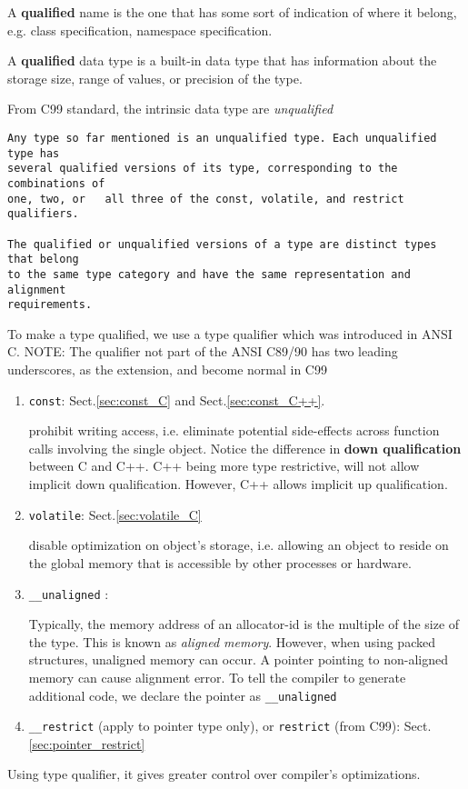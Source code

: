 A {\bf qualified} name is the one that has some sort of indication of where it
belong, e.g. class specification, namespace specification. 


 A {\bf qualified} data type is a built-in data type that has information
about the storage size, range of values, or precision of the type.  


From C99 standard,
the intrinsic data type are {\it unqualified}
\begin{verbatim}
Any type so far mentioned is an unqualified type. Each unqualified type has
several qualified versions of its type, corresponding to the combinations of
one, two, or   all three of the const, volatile, and restrict qualifiers.

The qualified or unqualified versions of a type are distinct types that belong
to the same type category and have the same representation and alignment
requirements.   
\end{verbatim}

To make a type qualified, we use a type qualifier which was introduced in ANSI
C. NOTE: The qualifier not part of the ANSI C89/90 has two leading underscores,
as the extension, and become normal in C99
\begin{enumerate}
  \item \verb!const!: Sect.\ref{sec:const_C} and Sect.\ref{sec:const_C++}.
  
prohibit writing access, i.e. eliminate potential side-effects across function
calls involving the single object. Notice the difference in {\bf down
qualification} between C and C++. C++ being more type restrictive, will not
allow implicit down qualification. However, C++ allows implicit up
qualification.

  \item \verb!volatile!: Sect.\ref{sec:volatile_C}
  
disable optimization on object's storage, i.e. allowing an object to reside on
the global memory that is accessible by other processes or hardware.
   
  \item \verb!__unaligned! :
  
Typically, the memory address of an allocator-id is the multiple of the size of
the type. This is known as {\it aligned memory}. However, when using packed
structures, unaligned memory can occur. A pointer pointing to non-aligned memory
can cause alignment error. To tell the compiler to generate additional code, we
declare the pointer as \verb!__unaligned!
  
  \item \verb!__restrict! (apply to pointer type only),
  or \verb!restrict! (from C99):  Sect.\ref{sec:pointer_restrict}
  
\end{enumerate}
Using type qualifier, it gives greater control over compiler's optimizations.




